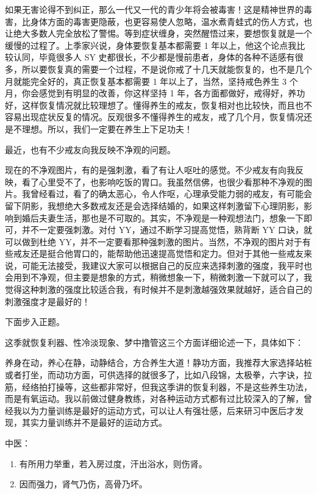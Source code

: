 \documentclass{ctexart}
\begin{document}
如果无害论得不到纠正，那么一代又一代的青少年将会被毒害！这是精神世界的毒害，比身体方面的毒害更隐蔽，也更容易使人忽略，温水煮青蛙式的伤人方式，也让绝大多数人完全放松了警惕。等到症状缠身，突然醒悟过来，要想恢复就是一个缓慢的过程了。上季家兴说，身体要恢复基本都需要 1 年以上，他这个论点我比较认同，毕竟很多人 SY 史都很长，不少都是慢前患者，身体的各种不适感有很多，所以要恢复真的需要一个过程，不是说你戒了十几天就能恢复的，也不是几个月就能完全好的，真正恢复基本都需要 1 年以上了，当然，坚持戒色养生 3 个月，你会感觉到有明显的改善，你这样坚持 1 年，各方面都做好，戒得好，养功好，这样恢复情况就比较理想了。懂得养生的戒友，恢复相对也比较快，而且也不容易出现症状反复的情况。反观很多不懂得养生的戒友，戒了几个月，恢复情况还是不理想。所以，我们一定要在养生上下足功夫！

最近，也有不少戒友向我反映不净观的问题。

现在的不净观图片，有的是强刺激，看了有让人呕吐的感觉。不少戒友有向我反映，看了心里受不了，也影响吃饭的胃口。我虽然信佛，也很少看那种不净观的图片。我曾经看过，看了的确太恶心，令人作呕，心理承受能力弱的戒友，有可能会留下阴影，我想绝大多数戒友还是会选择结婚的，如果这样刺激留下心理阴影，影响到婚后夫妻生活，那也是不可取的。其实，不净观是一种观想法门，想象一下即可，并不一定要强刺激。对付 YY，通过不断学习提高觉悟，熟背断 YY 口诀，就可以做到杜绝 YY，并不一定要看那种强刺激的图片。当然，不净观的图片对于有些戒友还是挺合他胃口的，能帮助他迅速提高觉悟和定力。但对于其他一些戒友来说，可能无法接受，我建议大家可以根据自己的反应来选择刺激的强度，我平时也会用到不净观，但主要是想象的方式，稍微想象一下，稍微刺激一下就可以了，我觉得这种刺激的强度比较适合我，有时候并不是刺激越强效果就越好，适合自己的刺激强度才是最好的！

下面步入正题。

这季就恢复利器、性冷淡现象、梦中撸管这三个方面详细论述一下，具体如下：

养身在动，养心在静，动静结合，方合养生大道！静功方面，我推荐大家选择站桩或者打坐，而动功方面，可供选择的就很多了，比如八段锦，太极拳，六字诀，拉筋，经络拍打操等，这些都非常好，但我这季讲的恢复利器，不是这些养生功法，而是有氧运动。我以前做过健身教练，对各种运动方式都有过比较深入的了解，曾经我以为力量训练是最好的运动方式，可以让人有强壮感，后来研习中医后才发现，其实力量训练并不是最好的运动方式。

中医：

\begin{enumerate}
    \item 有所用力举重，若入房过度，汗出浴水，则伤肾。
    \item 因而强力，肾气乃伤，高骨乃坏。
\end{enumerate}
\end{document}
